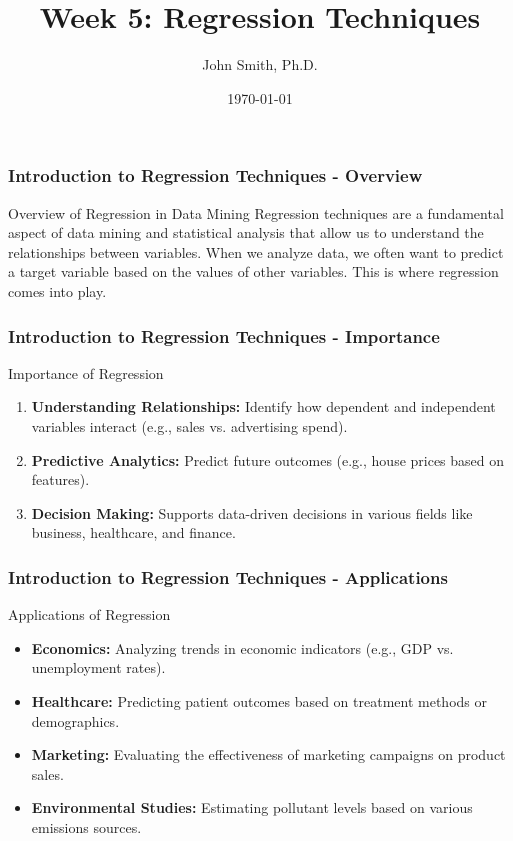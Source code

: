 \documentclass[aspectratio=169]{beamer}
\title[Week 5: Regression Techniques]{Week 5: Regression Techniques}
\author[J. Smith]{John Smith, Ph.D.}
\institute[University Name]{
  Department of Computer Science\\
  University Name\\
  \vspace{0.3cm}
  Email: email@university.edu\\
  Website: www.university.edu
}
\date{\today}
\begin{document}
\frame{\titlepage}

\begin{frame}[fragile]
    \frametitle{Introduction to Regression Techniques - Overview}
    \begin{block}{Overview of Regression in Data Mining}
        Regression techniques are a fundamental aspect of data mining and statistical analysis that allow us to understand the relationships between variables. When we analyze data, we often want to predict a target variable based on the values of other variables. This is where regression comes into play.
    \end{block}
\end{frame}

\begin{frame}[fragile]
    \frametitle{Introduction to Regression Techniques - Importance}
    \begin{block}{Importance of Regression}
        \begin{enumerate}
            \item \textbf{Understanding Relationships:} Identify how dependent and independent variables interact (e.g., sales vs. advertising spend).
            \item \textbf{Predictive Analytics:} Predict future outcomes (e.g., house prices based on features).
            \item \textbf{Decision Making:} Supports data-driven decisions in various fields like business, healthcare, and finance.
        \end{enumerate}
    \end{block}
\end{frame}

\begin{frame}[fragile]
    \frametitle{Introduction to Regression Techniques - Applications}
    \begin{block}{Applications of Regression}
        \begin{itemize}
            \item \textbf{Economics:} Analyzing trends in economic indicators (e.g., GDP vs. unemployment rates).
            \item \textbf{Healthcare:} Predicting patient outcomes based on treatment methods or demographics.
            \item \textbf{Marketing:} Evaluating the effectiveness of marketing campaigns on product sales.
            \item \textbf{Environmental Studies:} Estimating pollutant levels based on various emissions sources.
        \end{itemize}
    \end{block}
\end{frame}
\end{document}
